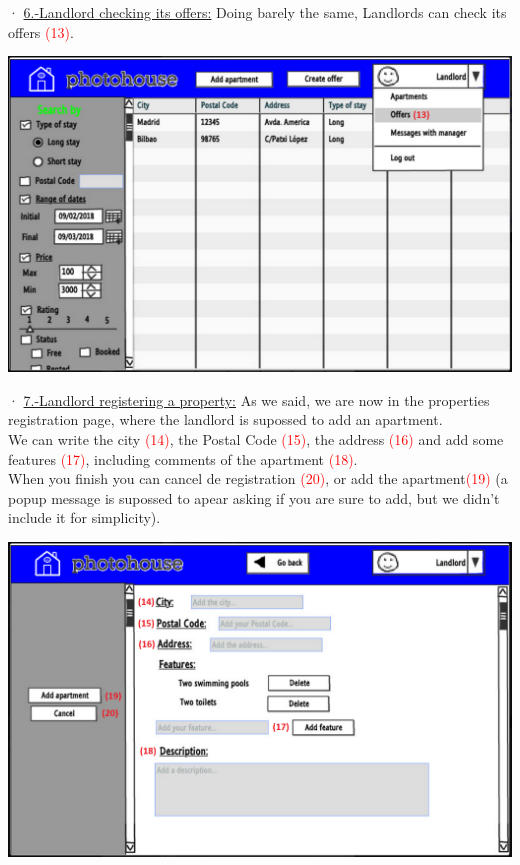 \documentclass[12pt]{article}
\begin{document}
{· \underline{6.-Landlord checking its offers:} Doing barely the same, Landlords can check its offers \textcolor{red}{(13)}.
\begin{center}
	\includegraphics[scale=.7]{landlord_offers.PNG}
\end{center}

\newpage
· \underline{7.-Landlord registering a property:} As we said, we are now in the properties registration page, where the landlord is supossed to add an apartment.\\ We can write the city \textcolor{red}{(14)}, the Postal Code \textcolor{red}{(15)}, the address \textcolor{red}{(16)} and add some features \textcolor{red}{(17)}, including comments of the apartment \textcolor{red}{(18)}.\\ When you finish you can cancel de registration \textcolor{red}{(20)}, or add the apartment\textcolor{red}{(19)} (a popup message is supossed to apear asking if you are sure to add, but we didn't include it for simplicity).
\begin{center}
	\includegraphics[scale=.7]{landlord_registering.PNG}
\end{center}


}
\end{document}
